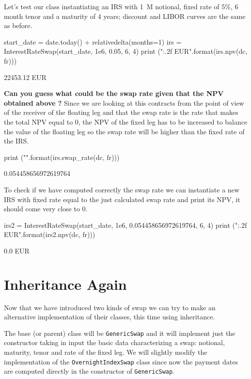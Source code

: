 Let's test our class instantiating an IRS with 1~M notional, fixed rate
of 5\%, 6 month tenor and a maturity of 4 years; discount and LIBOR
curves are the same as before.

\begin{ipython}
start_date = date.today() + relativedelta(months=1)
irs = InterestRateSwap(start_date, 1e6, 0.05, 6, 4)
print ("{:.2f} EUR".format(irs.npv(dc, fr)))
\end{ipython}
\begin{ioutput}
22453.12 EUR
\end{ioutput}

\textbf{Can you guess what could be the \textbf{swap rate} given that the NPV obtained above ?}
Since we are looking at this contracts from the point of view
of the receiver of the floating leg and that the swap rate is the rate that makes the total NPV equal to 0, the NPV of the fixed leg has to be increased to balance the value of the floating leg so the swap rate will be higher than the fixed rate of the IRS.

\begin{ipython}
print ("{}".format(irs.swap_rate(dc, fr)))
\end{ipython}
\begin{ioutput}
0.054458656972619764
\end{ioutput}
    
To check if we have computed correctly the swap rate we can
instantiate a new IRS with fixed rate equal to the just calculated swap
rate and print its NPV, it should come very close to 0.

\begin{ipython}
irs2 = InterestRateSwap(start_date, 1e6, 0.054458656972619764, 6, 4)
print ("{:.2f} EUR".format(irs2.npv(dc, fr)))
\end{ipython}
\begin{ioutput}
0.0 EUR
\end{ioutput}
    
\section{Inheritance Again}
Now that we have introduced two kinds of swap we can try to make an alternative implementation of their classes, this time using inheritance.

The base (or parent) class will be \texttt{GenericSwap} and it will implement just the constructor taking in input the basic data characterizing a swap: notional, maturity, tenor and rate of the fixed leg. We will slightly modify the implementation of the \texttt{OvernightIndexSwap} class since now the payment dates are computed directly in the constructor of \texttt{GenericSwap}.

